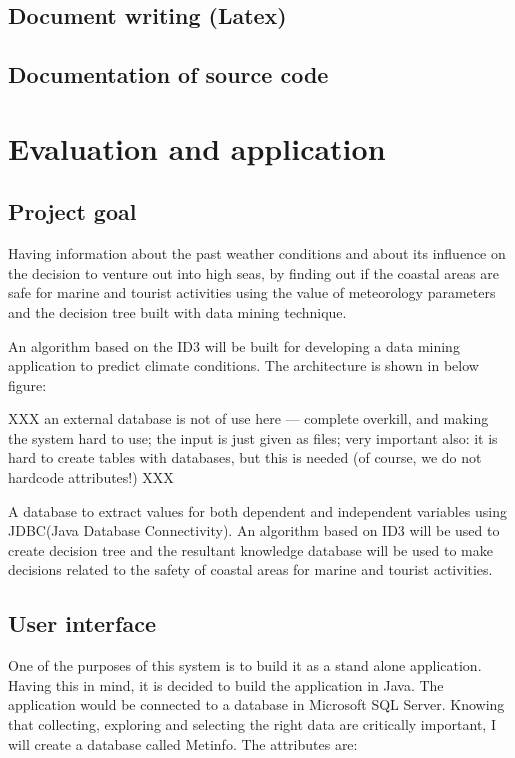 \documentclass{article}
\begin{document}
\subsection{Document writing (Latex)}
\label{sec:latex}





\subsection{Documentation of source code}
\label{sec:documentsource}


\section{Evaluation and application}
\label{sec:eval}

\subsection{Project goal}
\label{sec:goal}

Having information about the past weather conditions and about its influence on the decision to venture out into high
seas, by finding out if the coastal areas are safe for marine and tourist activities using the value of meteorology parameters and the decision tree built with data mining technique.

An algorithm based on the ID3 will be built for developing a data mining application to predict climate conditions.
The architecture is shown in below figure:

XXX an external database is not of use here --- complete overkill, and making
the system hard to use; the input is just given as files; very important also:
it is hard to create tables with databases, but this is needed (of course,
we do not hardcode attributes!) XXX

 A database to extract values for both dependent and independent variables using JDBC(Java Database Connectivity).
An algorithm based on ID3 will be used to create decision tree and the resultant knowledge database will be used to make decisions related to the safety of coastal areas for marine and tourist activities.

\subsection{User interface}

One of the purposes of this system is to build it as a stand alone application. Having this in mind, it is decided to build the application in Java. The application would be connected to a database in Microsoft SQL Server. Knowing that collecting, exploring and selecting the right data are critically important, I will create a database called Metinfo.
The attributes are:
\end{document}
